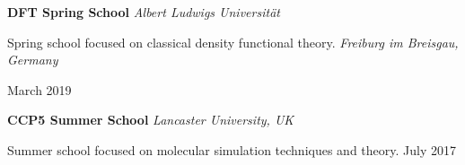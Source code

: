 {\bf DFT Spring School} \hfill \textit{Albert Ludwigs Universit{\"a}t}

Spring school focused on classical density functional theory.
\hfill \textit{Freiburg im Breisgau, Germany}

\hfill March 2019

\vspace{\y}
{\bf CCP5 Summer School} \hfill \textit{Lancaster University, UK}

Summer school focused on molecular simulation techniques and theory. \hfill July 2017

